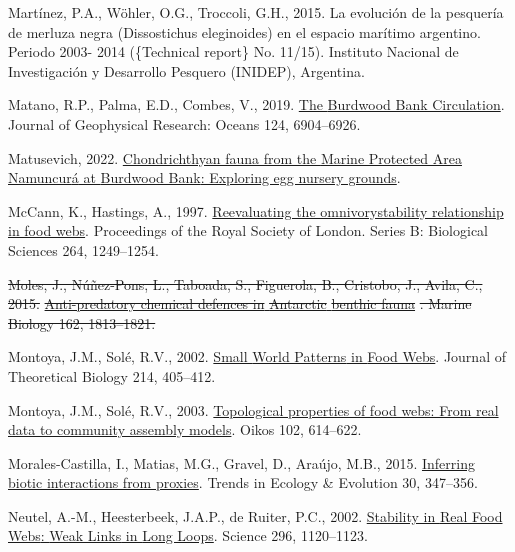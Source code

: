\documentclass[
]{article}
\newlength{\cslhangindent}
\newenvironment{CSLReferences}[2] %
 {\begin{list}{}{%
  \setlength{\itemindent}{0pt}
  \setlength{\leftmargin}{0pt}
  \setlength{\parsep}{0pt}
  \ifodd #1
   \setlength{\leftmargin}{\cslhangindent}
   \setlength{\itemindent}{-1\cslhangindent}
  \fi
  \setlength{\itemsep}{#2\baselineskip}}}
 {\end{list}}
\providecommand{\DIFdel}[1]{{\protect\color{red}\sout{#1}}}                      %
\providecommand{\DIFdelbegin}{} %
\providecommand{\DIFdelend}{} %
\newcommand{\DIFscaledelfig}{0.5}
\newlength{\DIFdelgraphicswidth} %
\newlength{\DIFdelgraphicsheight} %
\newcommand{\DIFdelincludegraphics}[2][]{%
\sbox{\DIFdelgraphicsbox}{\DIFOincludegraphics[#1]{#2}}%
\settoboxwidth{\DIFdelgraphicswidth}{\DIFdelgraphicsbox} %
\settoboxtotalheight{\DIFdelgraphicsheight}{\DIFdelgraphicsbox} %
\scalebox{\DIFscaledelfig}{%
\parbox[b]{\DIFdelgraphicswidth}{\usebox{\DIFdelgraphicsbox}\\[-\baselineskip] \rule{\DIFdelgraphicswidth}{0em}}\llap{\resizebox{\DIFdelgraphicswidth}{\DIFdelgraphicsheight}{%
\setlength{\unitlength}{\DIFdelgraphicswidth}%
\begin{picture}(1,1)%
\thicklines\linethickness{2pt} %
{\color[rgb]{1,0,0}\put(0,0){\framebox(1,1){}}}%
{\color[rgb]{1,0,0}\put(0,0){\line( 1,1){1}}}%
{\color[rgb]{1,0,0}\put(0,1){\line(1,-1){1}}}%
\end{picture}%
}\hspace*{3pt}}} %
} %
\DeclareRobustCommand{\DIFdelbegin}{\DIFOdelbegin \let\includegraphics\DIFdelincludegraphics} %
\DeclareRobustCommand{\DIFdelend}{\DIFOaddend \let\includegraphics\DIFOincludegraphics} %
\begin{document}
\begin{CSLReferences}{1}{0}
Martínez, P.A., Wöhler, O.G., Troccoli, G.H., 2015. {La evoluci{ó}n de
la pesquer{í}a de merluza negra (Dissostichus eleginoides) en el espacio
mar{í}timo argentino. Periodo 2003- 2014} (\{Technical report\} No.
11/15). {Instituto Nacional de Investigaci{ó}n y Desarrollo Pesquero
(INIDEP), Argentina}.

Matano, R.P., Palma, E.D., Combes, V., 2019.
\href{https://doi.org/10.1029/2019JC015001}{The {Burdwood Bank
Circulation}}. Journal of Geophysical Research: Oceans 124, 6904--6926.

Matusevich, 2022.
\href{https://doi.org/10.21203/rs.3.rs-2247873/v1}{Chondrichthyan fauna
from the {Marine Protected Area Namuncur{á}} at {Burdwood Bank}:
Exploring egg nursery grounds}.

McCann, K., Hastings, A., 1997.
\href{https://doi.org/10.1098/rspb.1997.0172}{Re{\textendash}evaluating
the omnivory{\textendash}stability relationship in food webs}.
Proceedings of the Royal Society of London. Series B: Biological
Sciences 264, 1249--1254.

\DIFdelbegin {}
\DIFdel{Moles, J., Núñez-Pons, L., Taboada, S., Figuerola, B., Cristobo, J.,
Avila, C., 2015.
}\href{https://doi.org/10.1007/s00227-015-2714-9}{\DIFdel{Anti-predatory chemical
defences in }%
\DIFdel{Antarctic}%
\DIFdel{benthic fauna}}%
\DIFdel{. Marine Biology 162, 1813--1821.
}%

\DIFdelend {}
Montoya, J.M., Solé, R.V., 2002.
\href{https://doi.org/10.1006/jtbi.2001.2460}{Small {World Patterns} in
{Food Webs}}. Journal of Theoretical Biology 214, 405--412.

Montoya, J.M., Solé, R.V., 2003.
\href{https://doi.org/10.1034/j.1600-0706.2003.12031.x}{Topological
properties of food webs: From real data to community assembly models}.
Oikos 102, 614--622.

Morales-Castilla, I., Matias, M.G., Gravel, D., Araújo, M.B., 2015.
\href{https://doi.org/10.1016/j.tree.2015.03.014}{Inferring biotic
interactions from proxies}. Trends in Ecology \& Evolution 30, 347--356.

Neutel, A.-M., Heesterbeek, J.A.P., de Ruiter, P.C., 2002.
\href{https://doi.org/10.1126/science.1068326}{Stability in {Real Food
Webs}: {Weak Links} in {Long Loops}}. Science 296, 1120--1123.


\end{CSLReferences}
\end{document}
